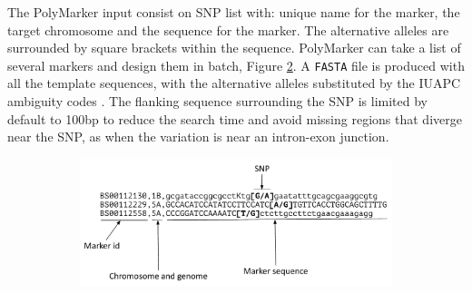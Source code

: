 The PolyMarker input consist on SNP list with: unique name for the marker, the target chromosome and the sequence for the marker. 
The alternative alleles are surrounded by square brackets within the sequence. PolyMarker can take a list of several markers and design them in batch, Figure \ref{fig:poly:input}. 
A \verb|FASTA| file is produced with all the template sequences, with the alternative alleles substituted by the IUAPC ambiguity codes \citep{Cornish-Bowden1985}. 
The flanking sequence surrounding the SNP is limited by default to 100bp to reduce the search time and avoid missing regions that diverge near the SNP, as when the variation is near an intron-exon junction. 

\begin{figure}
    \centering
    \begin{subfigure}[b]{0.8\textwidth}
        \includegraphics[width=1\textwidth]{PolyMarker/Figures/aln/input.pdf} 
        \caption{}
        \label{fig:poly:input}
    \end{subfigure}


\end{figure}
